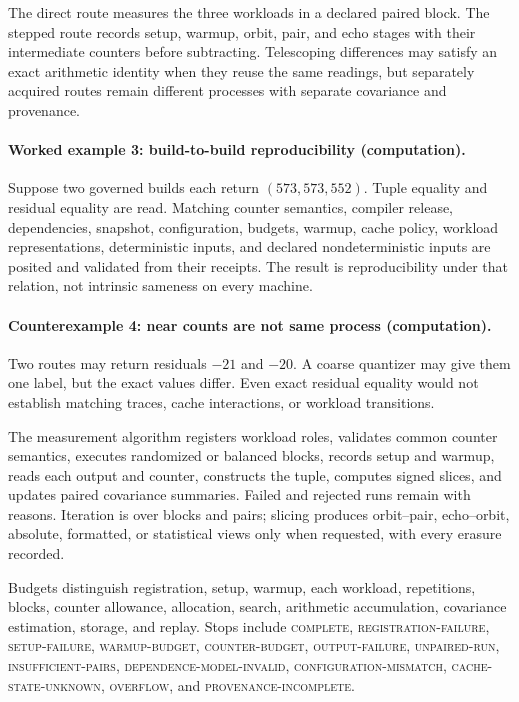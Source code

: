 The direct route measures the three workloads in a declared paired block.  The stepped route records setup, warmup,
orbit, pair, and echo stages with their intermediate counters before subtracting.  Telescoping differences may satisfy
an exact arithmetic identity when they reuse the same readings, but separately acquired routes remain different
processes with separate covariance and provenance.

\paragraph{Worked example 3: build-to-build reproducibility (computation).}
Suppose two governed builds each return \((573,573,552)\).  Tuple equality and residual equality are read.  Matching
counter semantics, compiler release, dependencies, snapshot, configuration, budgets, warmup, cache policy, workload
representations, deterministic inputs, and declared nondeterministic inputs are posited and validated from their
receipts.  The result is reproducibility under that relation, not intrinsic sameness on every machine.

\paragraph{Counterexample 4: near counts are not same process (computation).}
Two routes may return residuals \(-21\) and \(-20\).  A coarse quantizer may give them one label, but the exact values
differ.  Even exact residual equality would not establish matching traces, cache interactions, or workload
transitions.

The measurement algorithm registers workload roles, validates common counter semantics, executes randomized or
balanced blocks, records setup and warmup, reads each output and counter, constructs the tuple, computes signed slices,
and updates paired covariance summaries.  Failed and rejected runs remain with reasons.  Iteration is over blocks and
pairs; slicing produces orbit--pair, echo--orbit, absolute, formatted, or statistical views only when requested, with
every erasure recorded.

Budgets distinguish registration, setup, warmup, each workload, repetitions, blocks, counter allowance, allocation,
search, arithmetic accumulation, covariance estimation, storage, and replay.  Stops include \textsc{complete},
\textsc{registration-failure}, \textsc{setup-failure}, \textsc{warmup-budget}, \textsc{counter-budget},
\textsc{output-failure}, \textsc{unpaired-run}, \textsc{insufficient-pairs},
\textsc{dependence-model-invalid}, \textsc{configuration-mismatch}, \textsc{cache-state-unknown},
\textsc{overflow}, and \textsc{provenance-incomplete}.

